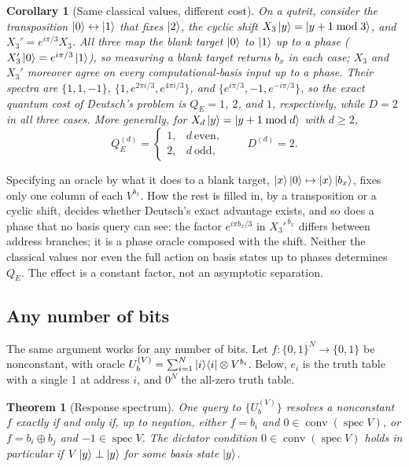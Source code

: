 \documentclass[
  aps,
  pra,
  reprint,
  nofootinbib
]{revtex4-2}
\newtheorem{theorem}{Theorem}
\newtheorem{corollary}{Corollary}
\begin{document}
\begin{corollary}[Same classical values, different cost]\label{cor:completions}
On a qutrit, consider the transposition \(\ket0\leftrightarrow\ket1\) that
fixes \(\ket2\), the cyclic shift \(X_3\ket y=\ket{y+1\bmod 3}\), and
\(X_3'=e^{i\pi/3}X_3\). All three map the blank target \(\ket0\) to \(\ket1\)
up to a phase (\(X_3'\ket0=e^{i\pi/3}\ket1\)), so measuring a blank target
returns \(b_x\) in each case; \(X_3\) and \(X_3'\)
moreover agree on every computational-basis input up to a phase. Their
spectra are \(\{1,1,-1\}\), \(\{1,e^{2\pi i/3},e^{4\pi i/3}\}\), and
\(\{e^{i\pi/3},-1,e^{-i\pi/3}\}\), so the exact quantum cost of Deutsch's
problem is \(Q_E=1\), \(2\), and \(1\), respectively, while \(D=2\) in all three
cases. More generally, for \(X_d\ket y=\ket{y+1\bmod d}\) with \(d\ge2\),
\begin{equation}
 Q_E^{(d)}=
 \begin{cases}1,&d\ \text{even},\\2,&d\ \text{odd},\end{cases}
 \qquad D^{(d)}=2.
 \label{eq:cyclic-response-cost}
\end{equation}
\end{corollary}

Specifying an oracle by what it does to a blank target,
\(\ket{x}\ket{0}\mapsto\ket{x}\ket{b_x}\), fixes only one column of each
\(V^{b_x}\). How the rest is filled in, by a transposition or a cyclic shift,
decides whether Deutsch's exact advantage exists, and so does a phase that no
basis query can see: the factor \(e^{i\pi b_x/3}\) in \(X_3'^{\,b_x}\) differs
between address branches; it is a phase oracle composed with the shift.
Neither the classical values nor even the full action on basis states up to
phases determines \(Q_E\). The effect is a constant factor, not an asymptotic
separation.

\subsection{Any number of bits}

The same argument works for any number of bits. Let
\(f:\{0,1\}^N\to\{0,1\}\) be nonconstant, with oracle
\(U_b^{(V)}=\sum_{i=1}^N\ket i\!\bra i\otimes V^{b_i}\). Below, \(e_i\) is the
truth table with a single 1 at address \(i\), and \(0^N\) the all-zero truth
table.

\begin{theorem}[Response spectrum]\label{thm:spectrum}
One query to \(\{U_b^{(V)}\}\) resolves a nonconstant \(f\) exactly if and only
if, up to negation, either \(f=b_i\) and
\(0\in\operatorname{conv}(\operatorname{spec}V)\), or \(f=b_i\oplus b_j\) and
\(-1\in\operatorname{spec}V\). The dictator condition
\(0\in\operatorname{conv}(\operatorname{spec}V)\) holds in particular if
\(V\ket y\perp\ket y\) for some basis state \(\ket y\).
\end{theorem}
\end{document}
